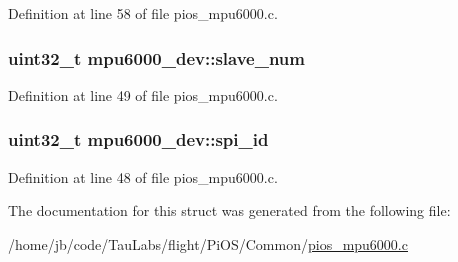 \-Definition at line 58 of file pios\-\_\-mpu6000.\-c.

\hypertarget{structmpu6000__dev_a2b1869dd86c392ccfe9a0cd881a3b4a7}{
\subsubsection[{slave\-\_\-num}]{\setlength{\rightskip}{0pt plus 5cm}uint32\-\_\-t {\bf mpu6000\-\_\-dev\-::slave\-\_\-num}}}\label{structmpu6000__dev_a2b1869dd86c392ccfe9a0cd881a3b4a7}


\-Definition at line 49 of file pios\-\_\-mpu6000.\-c.

\hypertarget{structmpu6000__dev_a7409608d24410d4ef980f9c05085bdb5}{
\subsubsection[{spi\-\_\-id}]{\setlength{\rightskip}{0pt plus 5cm}uint32\-\_\-t {\bf mpu6000\-\_\-dev\-::spi\-\_\-id}}}\label{structmpu6000__dev_a7409608d24410d4ef980f9c05085bdb5}


\-Definition at line 48 of file pios\-\_\-mpu6000.\-c.



\-The documentation for this struct was generated from the following file\-:\begin{DoxyCompactItemize}
\item 
/home/jb/code/\-Tau\-Labs/flight/\-Pi\-O\-S/\-Common/\hyperlink{pios__mpu6000_8c}{pios\-\_\-mpu6000.\-c}\end{DoxyCompactItemize}
